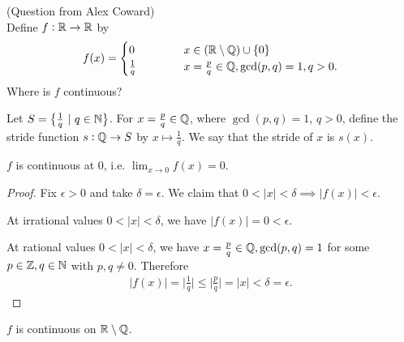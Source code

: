 \documentclass[12pt]{article}
\begin{document}
\begin{mdframed}
  (Question from Alex Coward)\\

  Define $f:\mathbb{R}\to\mathbb{R}$ by
  \begin{align*}
    f(x) =
    \begin{cases}
      0 ~~~~~~~~~~  & x \in (\mathbb{R}\setminus\mathbb{Q})\cup\{0\}\\
     \frac{1}{q}    & x = \frac{p}{q} \in \mathbb{Q}, \gcd(p, q) = 1, q > 0.
    \end{cases}
  \end{align*}
  Where is $f$ continuous?
\end{mdframed}

\begin{definition*}[Stride]
  Let $S = \big\{\frac{1}{q} ~|~ q \in \mathbb{N}\big\}$. For $x = \frac{p}{q} \in \mathbb{Q}$, where
  $\gcd(p, q) = 1$, $q > 0$, define the stride function $s:\mathbb{Q}\to S$ by $x \mapsto \frac{1}{q}$. We
  say that the stride of $x$ is $s(x)$.
\end{definition*}


\begin{claim*}
  $f$ is continuous at $0$, i.e. $\lim_{x \to 0}f(x) = 0$.
\end{claim*}

\begin{proof}
  Fix $\epsilon > 0$ and take $\delta = \epsilon$. We claim that
  $0 < |x| < \delta \implies |f(x)| < \epsilon$.

  At irrational values $0 < |x| < \delta$, we have $|f(x)| = 0 < \epsilon$.

  At rational values $0 < |x| < \delta$, we have $x = \frac{p}{q} \in \mathbb{Q}, \gcd(p, q) = 1$ for some
  $p \in \mathbb{Z}, q \in \mathbb{N}$ with $p, q \neq 0$. Therefore
  \begin{align*}
    |f(x)| = \Big|\frac{1}{q}\Big| \leq \Big|\frac{p}{q}\Big| = |x| < \delta = \epsilon.
  \end{align*}
\end{proof}

\begin{claim*}
  $f$ is continuous on $\mathbb{R}\setminus\mathbb{Q}$.
\end{claim*}
\end{document}
